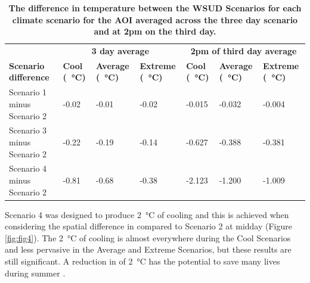 \documentclass[final,3p,times,authoryear]{elsarticle}
\begin{document}
\begin{table}[!htbp]
\caption{\bf The difference in  temperature between the WSUD Scenarios for each climate scenario for the AOI averaged across the three day scenario and at 2pm on the third day. \label{tab:scenarioDiffRep2}}     
\begin{tabular}{ l l l l l l l}
 \hline  \multicolumn{1}{|c}{}   &  \multicolumn{3}{|c|}{\textbf{3 day average}} & \multicolumn{3}{c|}{\textbf{2pm of third day average}}  \\
\textbf{Scenario difference} 
& \textbf{Cool (\SI{}{\degreeCelsius})}
& \textbf{Average (\SI{}{\degreeCelsius})}
& \textbf{Extreme (\SI{}{\degreeCelsius})}
& \textbf{Cool (\SI{}{\degreeCelsius})}
& \textbf{Average (\SI{}{\degreeCelsius})}
& \textbf{Extreme (\SI{}{\degreeCelsius})}
\\ \hline
Scenario 1 minus Scenario 2 & -0.02  & -0.01 & -0.02 &-0.015&-0.032&-0.004\\ 
Scenario 3 minus Scenario 2 & -0.22  & -0.19 & -0.14 &-0.627&-0.388&-0.381\\ 
Scenario 4 minus Scenario 2 & -0.81  & -0.68 & -0.38 &-2.123&-1.200&-1.009\\ 
\hline
\end{tabular}
\end{table}



Scenario 4 was designed to produce 2\SI{}{\degreeCelsius} of cooling and this is achieved when considering the spatial difference in  compared to Scenario 2 at midday (Figure \ref{fig:fig4}). The 2\SI{}{\degreeCelsius} of cooling is almost everywhere during the Cool Scenarios and less pervasive in the Average and Extreme Scenarios, but these results are still significant. A reduction in  of 2\SI{}{\degreeCelsius} has the potential to save many lives during summer \citep{Nicholls2008}.
\end{document}
